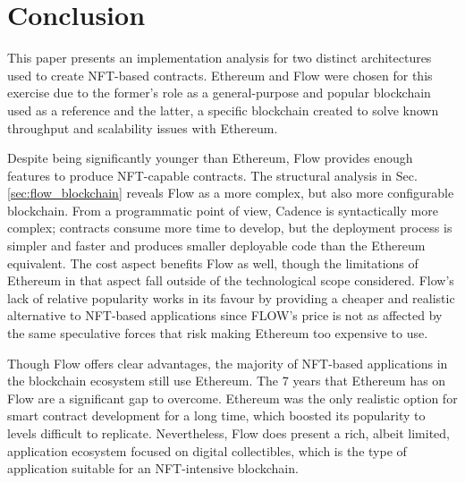\documentclass[../NFTComp_IEEE.tex]{subfiles}
\begin{document}
\section{Conclusion}
\label{sec:conclusion}
This paper presents an implementation analysis for two distinct architectures used to create NFT-based contracts. Ethereum and Flow were chosen for this exercise due to the former's role as a general-purpose and popular blockchain used as a reference and the latter, a specific blockchain created to solve known throughput and scalability issues with Ethereum.
\par
Despite being significantly younger than Ethereum, Flow provides enough features to produce NFT-capable contracts. The structural analysis in Sec. \ref{sec:flow_blockchain} reveals Flow as a more complex, but also more configurable blockchain. From a programmatic point of view, Cadence is syntactically more complex; contracts consume more time to develop, but the deployment process is simpler and faster and produces smaller deployable code than the Ethereum equivalent. The cost aspect benefits Flow as well, though the limitations of Ethereum in that aspect fall outside of the technological scope considered. Flow's lack of relative popularity works in its favour by providing a cheaper and realistic alternative to NFT-based applications since FLOW's price is not as affected by the same speculative forces that risk making Ethereum too expensive to use.
\par
Though Flow offers clear advantages, the majority of NFT-based applications in the blockchain ecosystem still use Ethereum. The 7 years that Ethereum has on Flow are a significant gap to overcome. Ethereum was the only realistic option for smart contract development for a long time, which boosted its popularity to levels difficult to replicate. Nevertheless, Flow does present a rich, albeit limited, application ecosystem focused on digital collectibles, which is the type of application suitable for an NFT-intensive blockchain.
\end{document}
